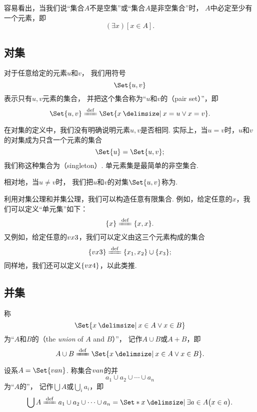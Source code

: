 容易看出，当我们说“集合\(A\)不是空集”或“集合\(A\)是非空集合”时，
\(A\)中必定至少有一个元素，即\[
	(\exists x)[x \in A].
\]

\subsection{对集}
\begin{definition}
对于任意给定的元素\(u\)和\(v\)，
我们用符号\[
	\Set{ u, v }
\]表示只有\(u,v\)元素的集合，
并把这个集合称为“\(u\)和\(v\)的（pair set）”，即\[
	\Set{ u, v } \defeq \Set{ x \given x = u \lor x = v }.
\]
\end{definition}
在对集的定义中，我们没有明确说明元素\(u,v\)是否相同.
实际上，当\(u=v\)时，\(u\)和\(v\)的对集成为只含一个元素的集合\[
	\Set{ u } = \Set{ u, v };
\]
我们称这种集合为（singleton）.
单元素集是最简单的非空集合.

相对地，当\(u \neq v\)时，
我们把\(u\)和\(v\)的对集\(\Set{u,v}\)称为.

利用对集公理和并集公理，我们可以构造任意有限集合.
例如，给定任意的\(x\)，我们可以定义“单元集”如下：\[
\{x\} \defeq \{x, x\}.
\]
又例如，给定任意的\(v{x}{3}\)，我们可以定义由这三个元素构成的集合
\[
	\{\v{x}{3}\} \defeq \{x_1,x_2\}\cup\{x_3\};
\]
同样地，我们还可以定义\(\{v{x}{4}\}\)，以此类推.


\subsection{并集}
\begin{definition}
称\[
	\Set{ x \given x \in A \lor x \in B }
\]为“\(A\)和\(B\)的（the \emph{union} of \(A\) and \(B\)）”，
记作\(A \cup B\)或\(A+B\)，即\[
	A \cup B \defeq \Set{ x \given x \in A \lor x \in B }.
\]
\end{definition}


\begin{definition}
设系\(A = \Set{\v{a}{n}}\).
称集合\(v{a}{n}\)的并\[
	a_1 \cup a_2 \cup \dotsb \cup a_n
\]为“\(A\)的”，
记作\(\bigcup A\)或\(\bigcup\limits_i a_i\)，即\[
	\bigcup A
	\defeq
	a_1 \cup a_2 \cup \dotsb \cup a_n
	= \Set*{ x \given \exists a \in A \bigl( x \in a \bigr) }.
\]
\end{definition}


